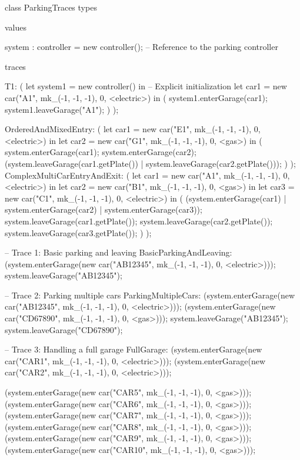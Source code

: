 \documentclass[a4paper]{article}
\begin{document}
\title{}
\author{}
\begin{vdm_al}
class ParkingTraces
types

values

    system : controller = new controller();  -- Reference to the parking controller
    

traces

T1:
(
    let system1 = new controller() in -- Explicit initialization
    let car1 = new car("A1", mk_(-1, -1, -1), 0, <electric>) in
    (
        system1.enterGarage(car1);
        system1.leaveGarage("A1");
    )
);


OrderedAndMixedEntry:
(
    let car1 = new car("E1", mk_(-1, -1, -1), 0, <electric>) in
    let car2 = new car("G1", mk_(-1, -1, -1), 0, <gas>) in
    (
        system.enterGarage(car1);
        system.enterGarage(car2);
        (system.leaveGarage(car1.getPlate()) | system.leaveGarage(car2.getPlate()));
    )
);
ComplexMultiCarEntryAndExit:
(
    let car1 = new car("A1", mk_(-1, -1, -1), 0, <electric>) in
    let car2 = new car("B1", mk_(-1, -1, -1), 0, <gas>) in
    let car3 = new car("C1", mk_(-1, -1, -1), 0, <electric>) in
    (
        (system.enterGarage(car1) | system.enterGarage(car2) | system.enterGarage(car3));
        system.leaveGarage(car1.getPlate());
        system.leaveGarage(car2.getPlate());
        system.leaveGarage(car3.getPlate());
    )
);

    -- Trace 1: Basic parking and leaving
    BasicParkingAndLeaving:
        (system.enterGarage(new car("AB12345", mk_(-1, -1, -1), 0, <electric>)));
        system.leaveGarage("AB12345");

    -- Trace 2: Parking multiple cars
    ParkingMultipleCars:
        (system.enterGarage(new car("AB12345", mk_(-1, -1, -1), 0, <electric>)));
        (system.enterGarage(new car("CD67890", mk_(-1, -1, -1), 0, <gas>)));
        system.leaveGarage("AB12345");
        system.leaveGarage("CD67890");

    -- Trace 3: Handling a full garage
    FullGarage:
        (system.enterGarage(new car("CAR1", mk_(-1, -1, -1), 0, <electric>)));
        (system.enterGarage(new car("CAR2", mk_(-1, -1, -1), 0, <electric>)));
        
        
        (system.enterGarage(new car("CAR5", mk_(-1, -1, -1), 0, <gas>)));  
        (system.enterGarage(new car("CAR6", mk_(-1, -1, -1), 0, <gas>)));
        (system.enterGarage(new car("CAR7", mk_(-1, -1, -1), 0, <gas>)));
        (system.enterGarage(new car("CAR8", mk_(-1, -1, -1), 0, <gas>)));
        (system.enterGarage(new car("CAR9", mk_(-1, -1, -1), 0, <gas>)));
        (system.enterGarage(new car("CAR10", mk_(-1, -1, -1), 0, <gas>)));




\end{vdm_al}
\end{document}
